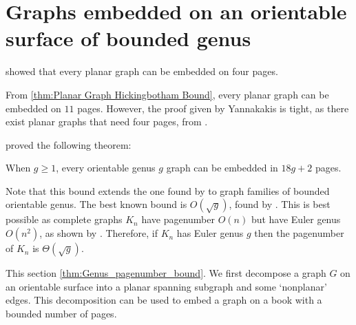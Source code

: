 
\section{Graphs embedded on an orientable surface of bounded genus}\label{sec:pagenumber_bounded_genus}

\textcite{yannakakisEmbeddingPlanarGraphs1989} showed that every planar graph can be embedded on four pages.

From \cref{thm:Planar Graph Hickingbotham Bound}, every planar graph can be embedded on $11$ pages. However, the proof given by Yannakakis is tight, as there exist planar graphs that need four pages, from \textcite{yannakakisPlanarGraphsThat2020,bekosFourPagesAre2020}. 

\textcite{heathPagenumberGenusGraphs1992} proved the following theorem:
\begin{theorem}\label{thm:Genus_pagenumber_bound}
	When $g \geq 1$, every orientable genus $g$ graph can be embedded in $18g+2$ pages.
\end{theorem}
Note that this bound extends the one found by \textcite{yannakakisEmbeddingPlanarGraphs1989} to graph families of bounded orientable genus.
The best known bound is \(O(\sqrt{g})\), found by \textcite{malitzGenusGraphsHave1994}. This is best possible as complete graphs $K_n$ have pagenumber $O(n)$ but have Euler genus $O(n^2)$, as shown by \textcite{ringelMapColorTheorem1974}. Therefore, if $K_n$ has Euler genus $g$ then the pagenumber of $K_n$ is $\Theta(\sqrt{g})$.


This section \cref{thm:Genus_pagenumber_bound}. We first decompose a graph $G$ on an orientable surface into a planar spanning subgraph and some `nonplanar' edges. This decomposition can be used to embed a graph on a book with a bounded number of pages.

